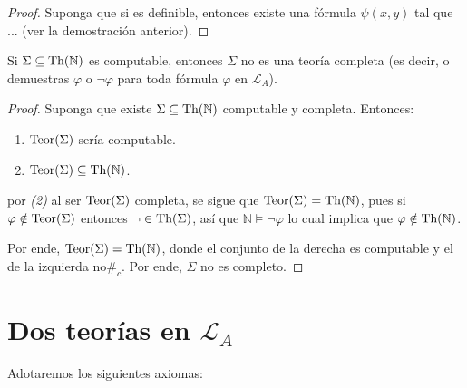 \documentclass[12pt]{report}
\newcounter{it}
\theoremstyle{largebreak}
\newcommand\contradiction{\ensuremath{\#_c}}
\begin{document}
    \begin{proof}
        Suponga que si es definible, entonces existe una fórmula $\psi(x,y)$ tal que ... (ver la demostración anterior).
    \end{proof}

    \begin{cor}
        Si $\Sigma\subseteq\textup{Th}(\mathbb{N})$ es computable, entonces $\Sigma$ no es una teoría completa (es decir, o demuestras $\varphi$ o $\neg\varphi$ para toda fórmula $\varphi$ en $\mathcal{L}_A$).
    \end{cor}

    \begin{proof}
        Suponga que existe $\Sigma\subseteq\textup{Th}(\mathbb{N})$ computable y completa. Entonces:
        \begin{enumerate}[label = \textit{(\arabic*)}]
            \item $\textup{Teor}(\Sigma)$ sería computable.
            \item $\textup{Teor}(\Sigma)\subseteq\textup{Th}(\mathbb{N})$.
        \end{enumerate}
        por \textit{(2)} al ser $\textup{Teor}(\Sigma)$ completa, se sigue que $\textup{Teor}(\Sigma)=\textup{Th}(\mathbb{N})$, pues si $\varphi\notin\textup{Teor}(\Sigma)$ entonces $\neg\in\textup{Th}(\Sigma)$, así que $\mathbb{N}\vDash\neg\varphi$ lo cual implica que $\varphi\notin\textup{Th}(\mathbb{N})$.

        Por ende, $\textup{Teor}(\Sigma)=\textup{Th}(\mathbb{N})$, donde el conjunto de la derecha es computable y el de la izquierda no\contradiction. Por ende, $\Sigma$ no es completo.
    \end{proof}

    \section{Dos teorías en $\mathcal{L}_A$}

    Adotaremos los siguientes axiomas:
\end{document}
